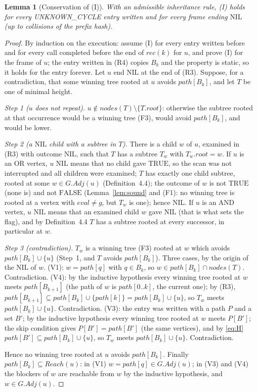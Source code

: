 \documentclass{article}
\theoremstyle{plain}
\newtheorem{lemma}[theorem]{Lemma}
\theoremstyle{definition}
\theoremstyle{remark}
\newcommand{\Adj}{\mathit{Adj}}
\newcommand{\eval}{\mathit{eval}}
\newcommand{\nodes}{\mathit{nodes}}
\newcommand{\Reach}{\mathit{Reach}}
\newcommand{\TRUE}{\ensuremath{\mathrm{TRUE}}}
\newcommand{\FALSE}{\ensuremath{\mathrm{FALSE}}}
\newcommand{\NIL}{\ensuremath{\mathrm{NIL}}}
\newcommand{\UC}{\textsf{UNKNOWN\_CYCLE}}
\begin{document}
\begin{lemma}[Conservation of (I)]\label{lem:cons}
With an admissible inheritance rule, (I) holds for every \UC{} entry written and for every frame ending \NIL{} (up to collisions of the prefix hash).
\end{lemma}
\begin{proof}
By induction on the execution: assume (I) for every entry written before and for every call completed before the end of $\mathit{rec}(k)$ for $u$, and prove (I) for the frame of $u$; the entry written in (R4) copies $B_k$ and the property is static, so it holds for the entry forever. Let $u$ end \NIL{} at the end of (R3). Suppose, for a contradiction, that some winning tree rooted at $u$ avoids $\mathit{path}[B_k]$, and let $T$ be one of minimal height.

\emph{Step 1 ($u$ does not repeat).} $u \notin \nodes(T) \setminus \{T.\mathit{root}\}$: otherwise the subtree rooted at that occurrence would be a winning tree (F3), would avoid $\mathit{path}[B_k]$, and would be lower.

\emph{Step 2 (a \NIL{} child with a subtree in $T$).} There is a child $w$ of $u$, examined in (R3) with outcome \NIL{}, such that $T$ has a subtree $T_w$ with $T_w.\mathit{root} = w$. If $u$ is an OR vertex, $u$ \NIL{} means that no child gave \TRUE{}, so the scan was not interrupted and all children were examined; $T$ has exactly one child subtree, rooted at some $w \in G.\Adj(u)$ (Definition~4.4); the outcome of $w$ is not \TRUE{} (none is) and not \FALSE{} (Lemma~\ref{lem:sound} and (F1): no winning tree is rooted at a vertex with $\eval \neq g$, but $T_w$ is one); hence \NIL{}. If $u$ is an AND vertex, $u$ \NIL{} means that an examined child $w$ gave \NIL{} (that is what sets the flag), and by Definition~4.4 $T$ has a subtree rooted at every successor, in particular at $w$.

\emph{Step 3 (contradiction).} $T_w$ is a winning tree (F3) rooted at $w$ which avoids $\mathit{path}[B_k] \cup \{u\}$ (Step~1, and $T$ avoids $\mathit{path}[B_k]$). Three cases, by the origin of the \NIL{} of $w$.
(V1): $w = \mathit{path}[q]$ with $q \in B_k$, so $w \in \mathit{path}[B_k] \cap \nodes(T)$. Contradiction.
(V4): by the inductive hypothesis every winning tree rooted at $w$ meets $\mathit{path}[B_{k+1}]$ (the path of $w$ is $\mathit{path}[0..k]$, the current one); by (R3), $\mathit{path}[B_{k+1}] \subseteq \mathit{path}[B_k] \cup \{\mathit{path}[k]\} = \mathit{path}[B_k] \cup \{u\}$, so $T_w$ meets $\mathit{path}[B_k] \cup \{u\}$. Contradiction.
(V3): the entry was written with a path $P$ and a set $B'$; by the inductive hypothesis every winning tree rooted at $w$ meets $P[B']$; the skip condition gives $P[B'] = \mathit{path}[B']$ (the same vertices), and by \eqref{eq:H} $\mathit{path}[B'] \subseteq \mathit{path}[B_k] \cup \{u\}$, so $T_w$ meets $\mathit{path}[B_k] \cup \{u\}$. Contradiction.

Hence no winning tree rooted at $u$ avoids $\mathit{path}[B_k]$. Finally $\mathit{path}[B_k] \subseteq \Reach(u)$: in (V1) $w = \mathit{path}[q] \in G.\Adj(u)$; in (V3) and (V4) the blockers of $w$ are reachable from $w$ by the inductive hypothesis, and $w \in G.\Adj(u)$.
\end{proof}
\end{document}
